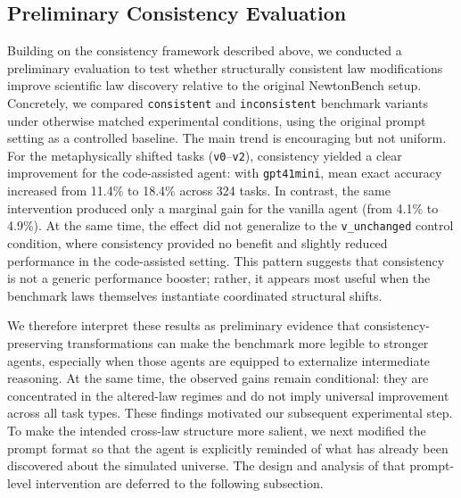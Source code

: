 \subsection{Preliminary Consistency Evaluation}
\label{sec:consistency_test}

Building on the consistency framework described above, we conducted a preliminary evaluation to test whether structurally consistent law modifications improve scientific law discovery relative to the original NewtonBench setup. Concretely, we compared \texttt{consistent} and \texttt{inconsistent} benchmark variants under otherwise matched experimental conditions, using the original prompt setting as a controlled baseline. The main trend is encouraging but not uniform. For the metaphysically shifted tasks (\texttt{v0}--\texttt{v2}), consistency yielded a clear improvement for the code-assisted agent: with \texttt{gpt41mini}, mean exact accuracy increased from 11.4\% to 18.4\% across 324 tasks. In contrast, the same intervention produced only a marginal gain for the vanilla agent (from 4.1\% to 4.9\%). At the same time, the effect did not generalize to the \texttt{v\_unchanged} control condition, where consistency provided no benefit and slightly reduced performance in the code-assisted setting. This pattern suggests that consistency is not a generic performance booster; rather, it appears most useful when the benchmark laws themselves instantiate coordinated structural shifts.

We therefore interpret these results as preliminary evidence that consistency-preserving transformations can make the benchmark more legible to stronger agents, especially when those agents are equipped to externalize intermediate reasoning. At the same time, the observed gains remain conditional: they are concentrated in the altered-law regimes and do not imply universal improvement across all task types. These findings motivated our subsequent experimental step. To make the intended cross-law structure more salient, we next modified the prompt format so that the agent is explicitly reminded of what has already been discovered about the simulated universe. The design and analysis of that prompt-level intervention are deferred to the following subsection.
